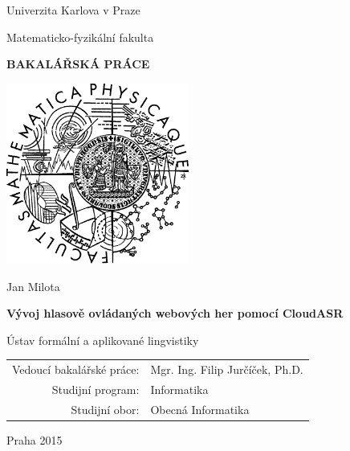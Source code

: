 \documentclass[12pt,a4paper]{report}
\begin{document}


\pagestyle{empty}
\begin{center}

\large

Univerzita Karlova v Praze

\medskip

Matematicko-fyzikální fakulta

\vfill

{\bf\Large BAKALÁŘSKÁ PRÁCE}

\vfill

\centerline{\mbox{\includegraphics[width=60mm]{img/logo.png}}}

\vfill
\vspace{5mm}

{\LARGE Jan Milota}

\vspace{15mm}

{\LARGE\bfseries Vývoj hlasově ovládaných webových her pomocí CloudASR}

\vfill

Ústav formální a aplikované lingvistiky

\vfill

\begin{tabular}{rl}

Vedoucí bakalářské práce: & Mgr. Ing. Filip Jurčíček, Ph.D. \\
\noalign{\vspace{2mm}}
Studijní program: & Informatika \\
\noalign{\vspace{2mm}}
Studijní obor: & Obecná  Informatika \\

\end{tabular}

\vfill

Praha 2015

\end{center}
\end{document}
